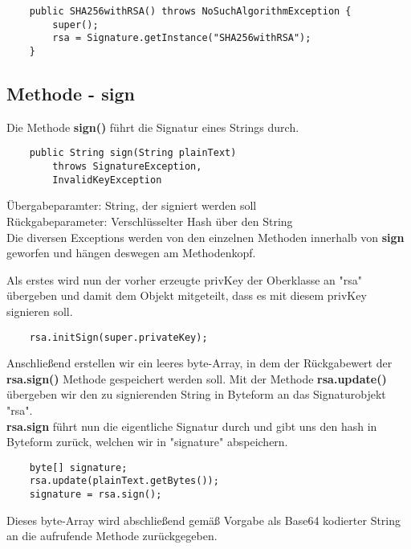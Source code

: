 \documentclass[12pt]{article}
\begin{document}
\begin{lstlisting}
    public SHA256withRSA() throws NoSuchAlgorithmException {
        super();
        rsa = Signature.getInstance("SHA256withRSA");
    }
\end{lstlisting}

\newpage

\subsection{Methode - sign}

Die Methode \textbf{sign()} führt die Signatur eines Strings durch.

\begin{lstlisting}
    public String sign(String plainText)
        throws SignatureException,
        InvalidKeyException
\end{lstlisting}

Übergabeparamter: String, der signiert werden soll\\
Rückgabeparameter: Verschlüsselter Hash über den String\\

Die diversen Exceptions werden von den einzelnen Methoden innerhalb von \textbf{sign} geworfen und hängen deswegen am Methodenkopf.

Als erstes wird nun der vorher erzeugte privKey der Oberklasse an "rsa" übergeben und damit dem Objekt mitgeteilt, dass es mit diesem privKey signieren soll.

\begin{lstlisting}
    rsa.initSign(super.privateKey);
\end{lstlisting}

Anschließend erstellen wir ein leeres byte-Array, in dem der Rückgabewert der \textbf{rsa.sign()} Methode gespeichert werden soll. Mit der Methode \textbf{rsa.update()} übergeben wir den zu signierenden String in Byteform an das Signaturobjekt "rsa".\\
\textbf{rsa.sign} führt nun die eigentliche Signatur durch und gibt uns den hash in Byteform zurück, welchen wir in "signature" abspeichern.

\begin{lstlisting}
    byte[] signature;
    rsa.update(plainText.getBytes());
    signature = rsa.sign();
\end{lstlisting}

Dieses byte-Array wird abschließend gemäß Vorgabe als Base64 kodierter String an die aufrufende Methode zurückgegeben.
\end{document}
